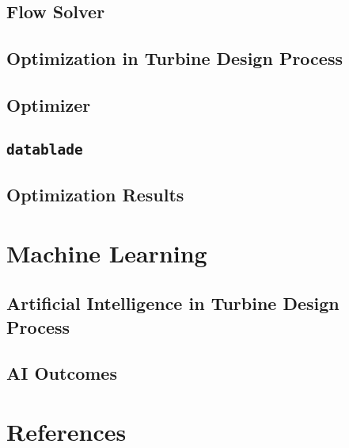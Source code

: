 \documentclass[UKenglish, aspectratio = 169]{beamer}
\begin{document}


\subsection{Flow Solver}
\SubSectionPage



\subsection{Optimization in Turbine Design Process}
\SubSectionPage



\subsection{Optimizer}
\SubSectionPage



\subsection{\texttt{datablade}}
\SubSectionPage



\subsection{Optimization Results}
\SubSectionPage



\section{Machine Learning}
\SectionPage



\subsection{Artificial Intelligence in Turbine Design Process}
\SubSectionPage



\subsection{AI Outcomes}
\SubSectionPage



\section{References}
\SectionPage


\end{document}
